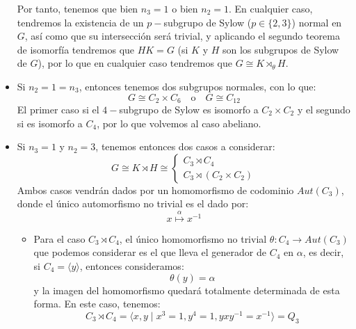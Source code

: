 \begin{itemize}
        Por tanto, tenemos que bien $n_3 = 1$ o bien $n_2 = 1$. En cualquier caso, tendremos la existencia de un $p-$subgrupo de Sylow ($p\in \{2,3\}$) normal en $G$, así como que su intersección será trivial, y aplicando el segundo teorema de isomorfía tendremos que $HK = G$ (si $K$ y $H$ son los subgrupos de Sylow de $G$), por lo que en cualquier caso tendremos que $G \cong K\rtimes_\theta H$.
    \item Si $n_2 = 1 = n_3$, entonces tenemos dos subgrupos normales, con lo que:
        \begin{equation*}
            G\cong C_2\times C_6 \quad \text{o} \quad G\cong C_{12}
        \end{equation*}
        El primer caso si el $4-$subgrupo de Sylow es isomorfo a $C_2\times C_2$ y el segundo si es isomorfo a $C_4$, por lo que volvemos al caso abeliano.
    \item Si $n_3 = 1$ y $n_2 = 3$, tenemos entonces dos casos a considerar:
        \begin{equation*}
            G\cong K\rtimes H \cong \left\{\begin{array}{l}
                    C_3\rtimes C_4 \\
                    C_3 \rtimes (C_2 \times C_2)
            \end{array}\right.
        \end{equation*}
        Ambos casos vendrán dados por un homomorfismo de codominio $Aut(C_3)$, donde el único automorfismo no trivial es el dado por:
        \begin{equation*}
            x \stackrel{\alpha}{\longmapsto} x^{-1}
        \end{equation*}
        \begin{itemize}
            \item Para el caso $C_3\rtimes C_4$, el único homomorfismo no trivial $\theta:C_4\to Aut(C_3)$ que podemos considerar es el que lleva el generador de $C_4$ en $\alpha$, es decir, si $C_4 = \langle y \rangle $, entonces consideramos:
                \begin{equation*}
                    \theta(y) = \alpha 
                \end{equation*}
                y la imagen del homomorfismo quedará totalmente determinada de esta forma. En este caso, tenemos:
                \begin{equation*}
                    C_3 \rtimes C_4 = \langle x,y\mid x^3=1, y^4 = 1, yxy^{-1}= x^{-1} \rangle = Q_3
                \end{equation*}

\end{itemize}
\end{itemize}
